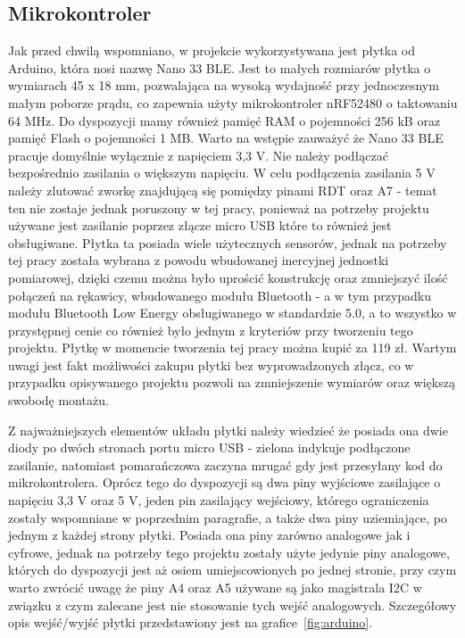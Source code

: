 	
	\subsection{Mikrokontroler}
	\label{subsec:arduino}
	Jak przed chwilą wspomniano, w projekcie wykorzystywana jest płytka od Arduino, która nosi nazwę Nano 33 BLE. Jest to małych rozmiarów płytka o  wymiarach 45 x 18 mm, pozwalająca na wysoką wydajność przy jednoczesnym małym poborze prądu, co zapewnia użyty mikrokontroler nRF52480 o taktowaniu 64 MHz. Do dyspozycji mamy również pamięć RAM o pojemności 256 kB oraz pamięć Flash o pojemności 1 MB. Warto na wstępie zauważyć że Nano 33 BLE pracuje domyślnie wyłącznie z napięciem 3,3 V. Nie należy podłączać bezpośrednio zasilania o większym napięciu. W celu podłączenia zasilania 5 V należy zlutować zworkę znajdującą się pomiędzy pinami RDT oraz A7 - temat ten nie zostaje jednak poruszony w tej pracy, ponieważ na potrzeby projektu używane jest zasilanie poprzez złącze micro USB które to również jest obsługiwane. Płytka ta posiada wiele użytecznych sensorów, jednak na potrzeby tej pracy została wybrana z powodu wbudowanej inercyjnej jednostki pomiarowej, dzięki czemu można było uprościć konstrukcję   oraz zmniejszyć ilość połączeń na rękawicy, wbudowanego modułu Bluetooth - a w tym przypadku modułu Bluetooth Low Energy obsługiwanego w standardzie 5.0, a to wszystko w przystępnej cenie co również było jednym z kryteriów przy tworzeniu tego projektu. Płytkę w momencie tworzenia tej pracy można kupić za 119 zł. Wartym uwagi jest fakt możliwości zakupu płytki bez wyprowadzonych złącz, co w przypadku opisywanego projektu pozwoli na zmniejszenie wymiarów oraz większą swobodę montażu.~\cite{botland-arduino}
	
	Z najważniejszych elementów układu płytki należy wiedzieć że posiada ona dwie diody po dwóch stronach portu micro USB - zielona indykuje podłączone zasilanie, natomiast pomarańczowa zaczyna mrugać gdy jest przesyłany kod do mikrokontrolera. Oprócz tego do dyspozycji są dwa piny wyjściowe zasilające o napięciu 3,3 V oraz 5 V, jeden pin zasilający wejściowy, którego ograniczenia zostały wspomniane w poprzednim paragrafie, a także dwa piny uziemiające, po jednym z każdej strony płytki. Posiada ona piny zarówno analogowe jak i cyfrowe, jednak na potrzeby tego projektu zostały użyte jedynie piny analogowe, których do dyspozycji jest aż osiem umiejscowionych po jednej stronie, przy czym warto zwrócić uwagę że piny A4 oraz A5 używane są jako magistrala I2C w związku z czym zalecane jest nie stosowanie tych wejść analogowych. Szczegółowy opis wejść/wyjść płytki przedstawiony jest na grafice~\ref{fig:arduino}.
	
